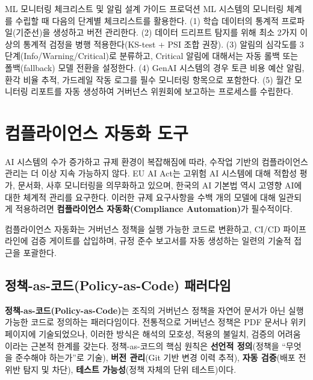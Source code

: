 \begin{practicaltool}{ML 모니터링 체크리스트 및 알림 설계 가이드}
프로덕션 ML 시스템의 모니터링 체계를 수립할 때 다음의 단계별 체크리스트를 활용한다. (1) 학습 데이터의 통계적 프로파일(기준선)을 생성하고 버전 관리한다. (2) 데이터 드리프트 탐지를 위해 최소 2가지 이상의 통계적 검정을 병행 적용한다(KS-test + PSI 조합 권장). (3) 알림의 심각도를 3단계(Info/Warning/Critical)로 분류하고, Critical 알림에 대해서는 자동 롤백 또는 폴백(fallback) 모델 전환을 설정한다. (4) GenAI 시스템의 경우 토큰 비용 예산 알림, 환각 비율 추적, 가드레일 작동 로그를 필수 모니터링 항목으로 포함한다. (5) 월간 모니터링 리포트를 자동 생성하여 거버넌스 위원회에 보고하는 프로세스를 수립한다.
\end{practicaltool}

\section{컴플라이언스 자동화 도구}
\label{sec:14.4}

AI 시스템의 수가 증가하고 규제 환경이 복잡해짐에 따라, 수작업 기반의 컴플라이언스 관리는 더 이상 지속 가능하지 않다. EU AI Act\cite{eu_ai_act}는 고위험 AI 시스템에 대해 적합성 평가, 문서화, 사후 모니터링을 의무화하고 있으며, 한국의 AI 기본법\cite{cset2025korea_ai_act} 역시 고영향 AI에 대한 체계적 관리를 요구한다. 이러한 규제 요구사항을 수백 개의 모델에 대해 일관되게 적용하려면 \textbf{컴플라이언스 자동화(Compliance Automation)}가 필수적이다.

컴플라이언스 자동화는 거버넌스 정책을 실행 가능한 코드로 변환하고, CI/CD 파이프라인에 검증 게이트를 삽입하며, 규정 준수 보고서를 자동 생성하는 일련의 기술적 접근을 포괄한다.

\subsection{정책-as-코드(Policy-as-Code) 패러다임}
\label{sec:14.4.1}

\textbf{정책-as-코드(Policy-as-Code)}는 조직의 거버넌스 정책을 자연어 문서가 아닌 실행 가능한 코드로 정의하는 패러다임이다. 전통적으로 거버넌스 정책은 PDF 문서나 위키 페이지에 기술되었으나, 이러한 방식은 해석의 모호성, 적용의 불일치, 검증의 어려움이라는 근본적 한계를 갖는다. 정책-as-코드의 핵심 원칙은 \textbf{선언적 정의}(정책을 ``무엇을 준수해야 하는가''로 기술), \textbf{버전 관리}(Git 기반 변경 이력 추적), \textbf{자동 검증}(배포 전 위반 탐지 및 차단), \textbf{테스트 가능성}(정책 자체의 단위 테스트)이다.

